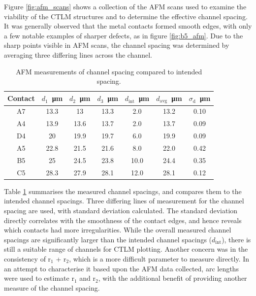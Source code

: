 \begin{refsection}
Figure \ref{fig:afm_scans} shows a collection of the AFM scans used to examine the viability of the CTLM structures and to determine the effective channel spacing. It was generally observed that the metal contacts formed smooth edges, with only a few notable examples of sharper defects, as in figure \ref{fig:b5_afm}. Due to the sharp points visible in AFM scans, the channel spacing was determined by averaging three differing lines across the channel. 

\begin{table}[ht]
\centering
\caption{AFM measurements of channel spacing compared to intended spacing.}
\label{tab:measurement_data}
\begin{tabular}{|c|c|c|c|c|c|c|}
\hline
\textbf{Contact} & \( d_{1} \)~\si{\micro\metre} & \( d_{2} \)~\si{\micro\metre} & \( d_{3} \)~\si{\micro\metre} & \( d_{\text{int}} \)~\si{\micro\metre} & \( d_{\text{avg}} \)~\si{\micro\metre} & \( \sigma_{\text{d}} \)~\si{\micro\metre} \\
\hline
A7 & 13.3 & 13 & 13.3 & 2.0 & 13.2 & 0.10 \\
A4 & 13.9 & 13.6 & 13.7 & 2.0 & 13.7 & 0.09 \\
D4 & 20 & 19.9 & 19.7 & 6.0 & 19.9 & 0.09 \\
A5 & 22.8 & 21.5 & 21.6 & 8.0 & 22.0 & 0.42 \\
B5 & 25 & 24.5 & 23.8 & 10.0 & 24.4 & 0.35 \\
C5 & 28.3 & 27.9 & 28.1 & 12.0 & 28.1 & 0.12 \\
\hline
\end{tabular}
\end{table}

Table \ref{tab:measurement_data} summarises the measured channel spacings, and compares them to the intended channel spacings. Three differing lines of measurement for the channel spacing are used, with standard deviation calculated. The standard deviation directly correlates with the smoothness of the contact edges, and hence reveals which contacts had more irregularities. While the overall measured channel spacings are significantly larger than the intended channel spacings ($d_{\text{int}}$), there is still a suitable range of channels for CTLM plotting. Another concern was in the consistency of r$_{1}$ + r$_{2}$, which is a more difficult parameter to measure directly. In an attempt to characterise it based upon the AFM data collected, arc lengths were used to estimate r$_{1}$ and r$_{2}$, with the additional benefit of providing another measure of the channel spacing. 


\end{refsection}
